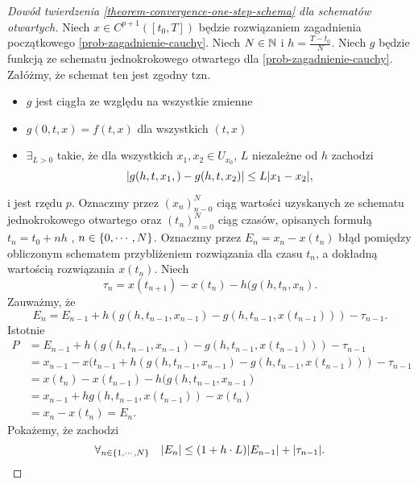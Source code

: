 \documentclass[12pt,a4paper]{report}
\begin{document}
\begin{proof}[Dowód twierdzenia \ref{theorem-convergence-one-step-schema} dla schematów otwartych]

Niech $ x \in C^{p+1}([t_0,T]) $ będzie rozwiązaniem zagadnienia początkowego  \ref{prob-zagadnienie-cauchy}. Niech $ N \in \mathbb{N} $ i $ h = \frac{T-t_0}{N} $. Niech $g$ będzie funkcją ze schematu jednokrokowego otwartego dla \ref{prob-zagadnienie-cauchy}. Załóżmy, że schemat ten jest zgodny tzn. 
\begin{itemize}
\item $g$ jest ciągła ze względu na wszystkie zmienne 
\item $ g(0,t,x) = f(t,x)$ dla wszystkich $ (t,x) $
\item $ \exists_{L>0} $ takie, że dla wszystkich $x_1 , x_2 \in U_{x_{0}} $, $L$ niezależne od $h$ zachodzi
$$
{\left| {g(h,t,x_1,) - g(h,t,x_2)} \right|} \leq L  {\left| {x_1 - x_2} \right|} ,
$$
\end{itemize}
i jest rzędu $p$. 
Oznaczmy przez $ (x_n)_{n-0}^{N} $ ciąg wartości uzyskanych ze schematu jednokrokowego otwartego oraz $(t_n)_{n=0}^{N}$ ciąg czasów, opisanych formułą $ t_n = t_0 + nh $ , $ n \in \left\lbrace {0, \cdots, N} \right\rbrace $. Oznaczmy przez $E_n = x_n - x(t_n)$ błąd pomiędzy obliczonym schematem przybliżeniem rozwiązania dla czasu $t_n$, a dokładną wartością rozwiązania $x(t_n)$. Niech 
$$
\tau_n = x(t_{n+1}) - x(t_n) - h(g(h,t_n,x_n).
$$ Zauważmy, że 
$$
E_n = E_{n-1} + h(g(h,t_{n-1},x_{n-1}) - g(h,t_{n-1},x(t_{n-1}))) - \tau_{n-1}. 
$$ 
Istotnie
\begin{equation}
\begin{array}{rl}
P &= E_{n-1} + h(g(h,t_{n-1},x_{n-1}) - g(h,t_{n-1},x(t_{n-1}))) - \tau_{n-1} \\
 &= x_{n-1} - x(t_{n-1} + h(g(h,t_{n-1},x_{n-1}) - g(h,t_{n-1},x(t_{n-1}))) - \tau_{n-1} \\
 &= x(t_{n}) - x(t_{n-1}) - h(g(h,t_{n-1},x_{n-1}) \\
 &= x_{n-1} + hg(h,t_{n-1},x(t_{n-1})) - x(t_n) \\
 &= x_n - x(t_n) = E_n .
\end{array}
\end{equation} 
Pokażemy, że zachodzi 
\begin{equation} \label{proof1}
\forall_{n \in \left\lbrace {1,\cdots,N} \right\rbrace} \quad  {\left| {E_n} \right|} \leq (1 + h \cdot L) {\left| {E_{n-1}} \right|} + {\left| {\tau_{n-1}} \right|} .
\end{equation}
 

\end{proof}
\end{document}
